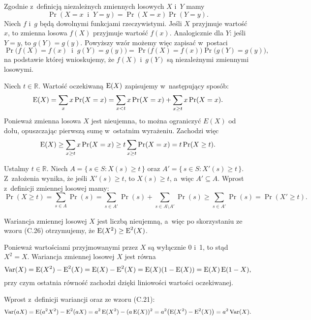 \exercise %
Zgodnie z~definicją niezależnych zmiennych losowych $X$ i~$Y$ mamy
\[
	\Pr(X=x\;\;\text{i}\;\;Y=y) = \Pr(X=x)\Pr(Y=y).
\]
Niech $f$ i~$g$ będą dowolnymi funkcjami rzeczywistymi.
Jeśli $X$ przyjmuje wartość $x$, to zmienna losowa $f(X)$ przyjmuje wartość $f(x)$.
Analogicznie dla $Y$: jeśli $Y=y$, to $g(Y)=g(y)$.
Powyższy wzór możemy więc zapisać w~postaci
\[
	\Pr\bigl(f(X)=f(x)\;\;\text{i}\;\;g(Y)=g(y)\bigr) = \Pr\bigl(f(X)=f(x)\bigr)\Pr\bigl(g(Y)=g(y)\bigr),
\]
na podstawie której wnioskujemy, że $f(X)$ i~$g(Y)$ są niezależnymi zmiennymi losowymi.

\exercise %
Niech $t\in\mathbb{R}$.
Wartość oczekiwaną $\operatorname{E}(X)$ zapisujemy w~następujący sposób:
\[
    \operatorname{E}(X) = \sum_xx\Pr(X=x) = \sum_{x<t}x\Pr(X=x)+\sum_{x\ge t}x\Pr(X=x).
\]
Ponieważ zmienna losowa $X$ jest nieujemna, to można ograniczyć $E(X)$ od dołu, opuszczając pierwszą sumę w~ostatnim wyrażeniu.
Zachodzi więc
\[
    \operatorname{E}(X) \ge \sum_{x\ge t}x\Pr(X=x) \ge t\sum_{x\ge t}\Pr(X=x) = t\Pr(X\ge t).
\]

\exercise %
Ustalmy $t\in\mathbb{R}$.
Niech $A=\{\,s\in S:X(s)\ge t\,\}$ oraz $A'=\{\,s\in S:X'(s)\ge t\,\}$.
Z~założenia wynika, że jeśli $X'(s)\ge t$, to $X(s)\ge t$, a~więc $A'\subseteq A$.
Wprost z~definicji zmiennej losowej mamy:
\[
	\Pr(X\ge t) = \sum_{s\in A}\Pr(s) = \sum_{s\in A'}\Pr(s)+\sum_{s\in A\setminus A'}\Pr(s) \ge \sum_{s\in A'}\Pr(s) = \Pr(X'\ge t).
\]

\exercise %
Wariancja zmiennej losowej $X$ jest liczbą nieujemną, a~więc po skorzystaniu ze wzoru (C.26) otrzymujemy, że $\operatorname{E}(X^2)\ge\operatorname{E}^2(X)$.

\exercise %
Ponieważ wartościami przyjmowanymi przez $X$ są wyłącznie 0 i~1, to stąd $X^2=X$.
Wariancja zmiennej losowej $X$ jest równa
\[
	\operatorname{Var}(X) = \operatorname{E}(X^2)-\operatorname{E}^2(X) = \operatorname{E}(X)-\operatorname{E}^2(X) = \operatorname{E}(X)(1-\operatorname{E}(X)) = \operatorname{E}(X)\operatorname{E}(1-X),
\]
przy czym ostatnia równość zachodzi dzięki liniowości wartości oczekiwanej.

\exercise %
Wprost z~definicji wariancji oraz ze wzoru (C.21):
\[
	\operatorname{Var}(aX) = \operatorname{E}(a^2X^2)-\operatorname{E}^2(aX) = a^2\operatorname{E}(X^2)-(a\operatorname{E}(X))^2 = a^2\bigl(\operatorname{E}(X^2)-\operatorname{E}^2(X)\bigr) = a^2\operatorname{Var}(X).
\]
